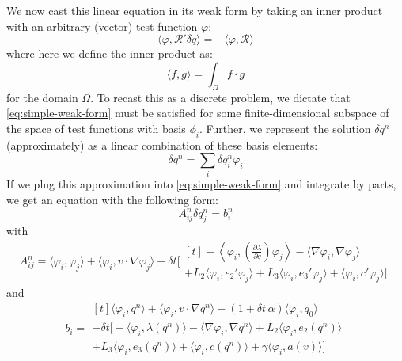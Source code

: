 \documentclass[reqno]{article}
\begin{document}
  We now cast this linear equation in its weak form by taking an inner product
  with an arbitrary (vector) test function $\varphi$:
  \begin{equation}\label{eq:simple-weak-form}
    \langle \varphi, \mathcal{R}' \delta q \rangle
    = -\langle \varphi, \mathcal{R} \rangle
  \end{equation}
  where here we define the inner product as:
  \begin{equation} 
    \langle f, g \rangle
    =
    \int_\Omega f \cdot g
  \end{equation}
  for the domain $\Omega$.
  To recast this as a discrete problem, we dictate that
  \eqref{eq:simple-weak-form} must be satisfied for some finite-dimensional
  subspace of the space of test functions with basis $\phi_i$.
  Further, we represent the solution $\delta q^n$ (approximately) as a linear
  combination of these basis elements:
  \begin{equation}
    \delta q^n = \sum_{i} \delta q^n_i \varphi_i
  \end{equation}
  If we plug this approximation into \eqref{eq:simple-weak-form} and integrate
  by parts, we get an equation with the following form:
  \begin{equation}
    A^n_{ij} \delta q^n_j = b^n_i
  \end{equation}
  with
  \begin{equation}
    A^n_{ij}
    =
    \langle \varphi_i, \varphi_j \rangle
    + \langle \varphi_i, v \cdot \nabla \varphi_j \rangle
    - \delta t \biggl[
    \begin{multlined}[t]
      -\left< \varphi_i, \left( \frac{\partial \lambda}{\partial q} \right) \varphi_j \right>
      - \langle \nabla \varphi_i, \nabla \varphi_j \rangle \\
      + L_2 \langle \varphi_i, e_2' \varphi_j \rangle
      + L_3 \langle \varphi_i, e_3' \varphi_j \rangle
      + \langle \varphi_i, c' \varphi_j \rangle
      \biggr]
    \end{multlined}
  \end{equation}
  and
  \begin{equation}
    b_i
    =
    \begin{multlined}[t]
    \langle \varphi_i, q^n \rangle
    + \langle \varphi_i, v \cdot \nabla q^n \rangle
    - (1 + \delta t \, \alpha) \langle \varphi_i, q_0 \rangle \\
    - \delta t \biggl[
      - \langle \varphi_i, \lambda(q^n) \rangle
      - \langle \nabla \varphi_i, \nabla q^n \rangle
      + L_2 \langle \varphi_i, e_2(q^n) \rangle \\
      + L_3 \langle  \varphi_i, e_3(q^n) \rangle
      + \langle \varphi_i, c(q^n) \rangle
      + \gamma \langle \varphi_i, a(v) \rangle
    \biggr]
    \end{multlined}
  \end{equation}
\end{document}
